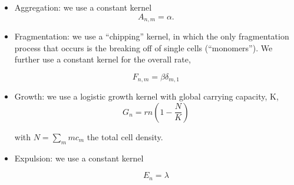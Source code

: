 \documentclass[12pt]{article}
\def\be{\begin{equation}}
\def\ee{\end{equation}}
\begin{document}
%
%
%
%
%


\begin{itemize}
\item
Aggregation: we use a constant kernel
\be
A_{n,m} = \alpha.
\ee

\item
Fragmentation: we use a ``chipping'' kernel, in which the only fragmentation process that occurs is the breaking off of single cells (``monomers''). We further use a constant kernel for the overall rate,

\be
F_{n,m} = \beta\delta_{m,1}
\ee

\item
Growth: we use a logistic growth kernel with global carrying capacity, K,
\be
G_n = rn\left(1-\frac{N}{K}\right)
\ee

\noindent with $N = \sum_m mc_m$ the total cell density.

\item
Expulsion: we use a constant kernel

\be
E_n = \lambda
\ee
\end{itemize}

\end{document}

